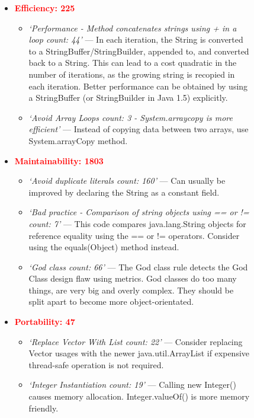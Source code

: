 \begin{figure}[tbp]
\begin{framed}
\begin{itemize}
    \item \textcolor{red}{\textbf{Efficiency: 225}}
    \begin{itemize}
        \item \textit{`Performance -  Method concatenates strings using + in a loop count: 44'} --- In each iteration, the String is converted to a StringBuffer/StringBuilder, appended to, and converted back to a String. This can lead to a cost quadratic in the number of iterations, as the growing string is recopied in each iteration. Better performance can be obtained by using a StringBuffer (or StringBuilder in Java 1.5) explicitly.
        \item \textit{`Avoid Array Loops count: 3 - System.arraycopy is more efficient'} --- Instead of copying data between two arrays, use System.arrayCopy method.
    \end{itemize}

    \item \textcolor{red}{\textbf{Maintainability: 1803}}
    \begin{itemize}
        \item \textit{`Avoid duplicate literals count: 160'} --- Can usually be improved by declaring the String as a constant field.
        \item \textit{`Bad practice - Comparison of string objects using == or != count: 7'} --- This code compares java.lang.String objects for reference equality using the == or != operators. Consider using the equals(Object) method instead.
        \item \textit{`God class count: 66'} --- The God class rule detects the God Class design flaw using metrics. God classes do too many things, are very big and overly complex. They should be split apart to become more object-orientated. 
    \end{itemize}
      
     \item \textcolor{red}{\textbf{Portability: 47}} 
    \begin{itemize}
        \item \textit{`Replace Vector With List count: 22'} ---
            Consider replacing Vector usages with the newer 
        java.util.ArrayList if expensive thread-safe operation is not required.
        \item \textit{`Integer Instantiation count: 19'} --- Calling new Integer() causes memory allocation. Integer.valueOf() is more memory friendly.
    \end{itemize}
    

\end{itemize}
\end{framed}
\end{figure}
